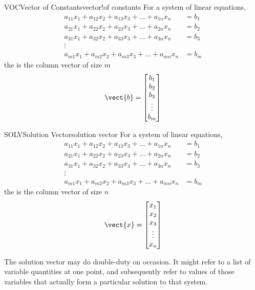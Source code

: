 \begin{definition}{VOC}{Vector of Constants}{vector!of constants}
For a system of linear equations,
\begin{align*}
a_{11}x_1+a_{12}x_2+a_{13}x_3+\dots+a_{1n}x_n&=b_1\\
a_{21}x_1+a_{22}x_2+a_{23}x_3+\dots+a_{2n}x_n&=b_2\\
a_{31}x_1+a_{32}x_2+a_{33}x_3+\dots+a_{3n}x_n&=b_3\\
\vdots&\\
a_{m1}x_1+a_{m2}x_2+a_{m3}x_3+\dots+a_{mn}x_n&=b_m
\end{align*}
the  is the column vector of size $m$
\begin{equation*}
\vect{b}=
\begin{bmatrix}
b_1\\
b_2\\
b_3\\
\vdots\\
b_m\\
\end{bmatrix}
\end{equation*}
\end{definition}
%
\begin{definition}{SOLV}{Solution Vector}{solution vector}
For a system of linear equations,
\begin{align*}
a_{11}x_1+a_{12}x_2+a_{13}x_3+\dots+a_{1n}x_n&=b_1\\
a_{21}x_1+a_{22}x_2+a_{23}x_3+\dots+a_{2n}x_n&=b_2\\
a_{31}x_1+a_{32}x_2+a_{33}x_3+\dots+a_{3n}x_n&=b_3\\
\vdots&\\
a_{m1}x_1+a_{m2}x_2+a_{m3}x_3+\dots+a_{mn}x_n&=b_m
\end{align*}
the  is the column vector of size $n$
\begin{equation*}
\vect{x}=
\begin{bmatrix}
x_1\\
x_2\\
x_3\\
\vdots\\
x_n\\
\end{bmatrix}
\end{equation*}
\end{definition}
%
The solution vector may do double-duty on occasion.  It might refer to a list of variable quantities at one point, and subsequently refer to values of those variables that actually form a particular solution to that system.
